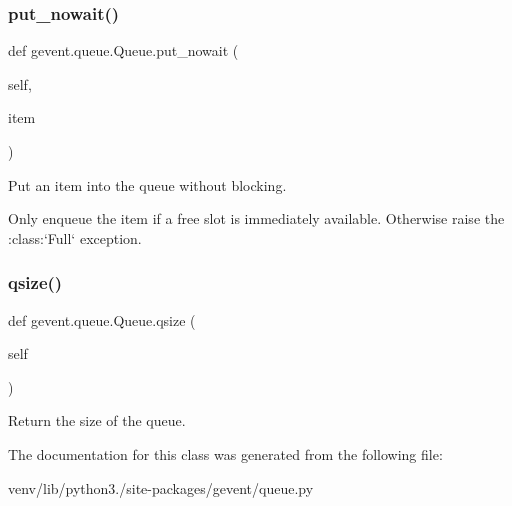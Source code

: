 \subsubsection{\texorpdfstring{put\+\_\+nowait()}{put\_nowait()}}
{\footnotesize\ttfamily def gevent.\+queue.\+Queue.\+put\+\_\+nowait (\begin{DoxyParamCaption}\item[{}]{self,  }\item[{}]{item }\end{DoxyParamCaption})}

\begin{DoxyVerb}Put an item into the queue without blocking.

Only enqueue the item if a free slot is immediately available.
Otherwise raise the :class:`Full` exception.
\end{DoxyVerb}
 \mbox{\label{classgevent_1_1queue_1_1_queue_a84c2f7fb732602fa1233026865a958df}} 
\subsubsection{\texorpdfstring{qsize()}{qsize()}}
{\footnotesize\ttfamily def gevent.\+queue.\+Queue.\+qsize (\begin{DoxyParamCaption}\item[{}]{self }\end{DoxyParamCaption})}

\begin{DoxyVerb}Return the size of the queue.\end{DoxyVerb}
 

The documentation for this class was generated from the following file\+:\begin{DoxyCompactItemize}
\item 
venv/lib/python3./site-\/packages/gevent/queue.\+py\end{DoxyCompactItemize}
